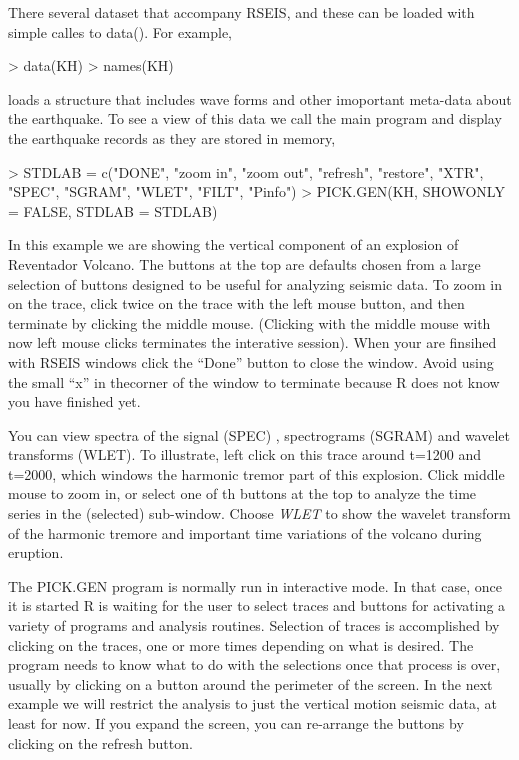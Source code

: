 \documentclass{article}
\begin{document}
There several dataset that accompany RSEIS,
and these can be loaded with simple calles to data().
For example,
\begin{Schunk}
\begin{Sinput}
> data(KH)
> names(KH)
\end{Sinput}
\end{Schunk}
loads a structure that includes wave forms and other imoportant
meta-data about the earthquake.  To see a view of this data
we call the main program and display the earthquake records as they are stored
in memory,


\begin{Schunk}
\begin{Sinput}
> STDLAB = c("DONE", "zoom in", "zoom out", "refresh", "restore", 
     "XTR", "SPEC", "SGRAM", "WLET", "FILT", "Pinfo")
> PICK.GEN(KH, SHOWONLY = FALSE, STDLAB = STDLAB)
\end{Sinput}
\end{Schunk}
In this example we are showing the vertical component of an explosion 
of Reventador Volcano.  The buttons at the top
are defaults chosen from a large selection of 
buttons designed to be useful for analyzing seismic data.
To zoom in on the trace, click twice on the trace with the left mouse button,
and then terminate by clicking the middle mouse.
(Clicking with the middle mouse with now left mouse clicks terminates the interative session).
When your are finsihed with RSEIS windows click the ``Done'' 
button to close the window.  Avoid using the small
``x'' in thecorner of the window to terminate because
R does not know you have finished yet.

You can view spectra of the signal (SPEC) , spectrograms (SGRAM) 
and wavelet transforms (WLET). To illustrate,
left click on this trace around t=1200 and t=2000, which 
windows the harmonic tremor part of this explosion.
Click middle mouse to zoom in, or
select one of th buttons at
the top to analyze the time series in the (selected) sub-window.
Choose  \emph{WLET} to show the wavelet transform of
the harmonic tremore and important time variations of the
volcano during eruption.

The PICK.GEN program is normally run in interactive mode.
In that case, once it is started R is waiting for
the user to select traces and buttons for
activating a variety of programs and analysis 
routines.
Selection of traces is accomplished by clicking on the traces,
one or more times depending 
on what is desired.
The program needs to know what to do with the 
selections once that process is over, 
usually by clicking on a button around the perimeter 
of the screen.  In the next example we will restrict the analysis
to just the vertical motion seismic data, at least for now.
If you expand the screen, you can re-arrange the buttons by
clicking on the refresh button.
\end{document}
